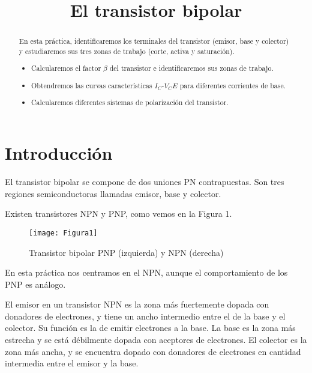 \documentclass[a4paper,12pt,spanish]{article}
\begin{document}
	
	
	
	
	
	\title{El transistor bipolar}
	
	\date{}
	
	\maketitle
	
	
	
\begin{abstract} %
	En esta práctica, identificaremos los terminales del transistor (emisor, base y colector) y estudiaremos sus tres zonas de trabajo (corte, activa y saturación).
	
	\begin{itemize}
		\item Calcularemos el factor $\beta$ del transistor e identificaremos sus zonas de trabajo.
		\item Obtendremos las curvas características $I_C$-$V_CE$ para diferentes corrientes de base.
		\item Calcularemos diferentes sistemas de polarización del transistor.
	\end{itemize}
\end{abstract}
	

\section{Introducción}

El transistor bipolar se compone de dos uniones PN contrapuestas. Son tres regiones semiconductoras llamadas emisor, base y colector. 

Existen transistores NPN y PNP, como vemos en la Figura 1. 

\begin{figure}[H]
	\centering
	\texttt{[image: Figura1]}
	\caption{Transistor bipolar PNP (izquierda) y NPN (derecha)}
	\label{fig:figura1}
\end{figure}

En esta práctica nos centramos en el NPN, aunque el comportamiento de los PNP es análogo.


El emisor en un transistor NPN es la zona más fuertemente
dopada con donadores de electrones, y tiene un ancho intermedio entre el de la base y el colector. Su función es la de emitir electrones a la base. La base es la zona más estrecha y se está débilmente dopada con aceptores
de electrones. El colector es la zona más ancha, y se encuentra dopado con donadores de electrones en cantidad intermedia entre el emisor y la base.
\end{document}
